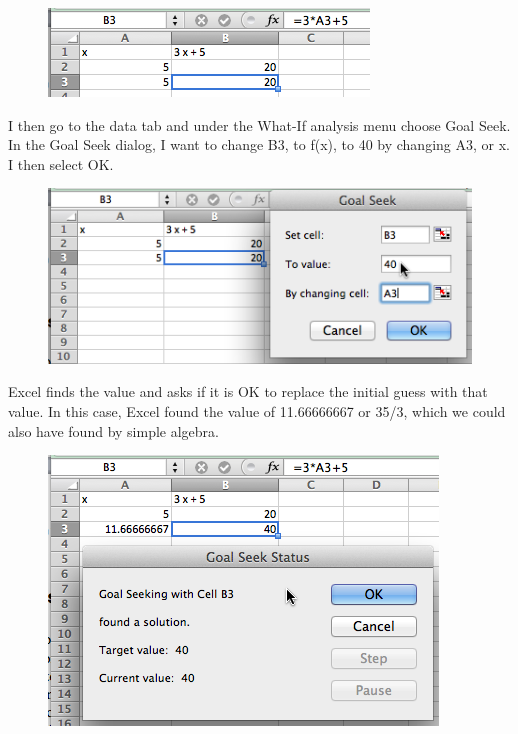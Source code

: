 \documentclass[10pt,]{book}
\theoremstyle{plain}
\theoremstyle{definition}
\theoremstyle{definition}
\begin{document}
  \leavevmode%
\begin{figure}
\centering
\includegraphics[width=0.8\linewidth]{images/sec1-6-1.png}
\end{figure}
 

%
\par

I then go to the data tab and under the What-If analysis menu choose Goal Seek.  In the Goal Seek dialog, I want to change B3, to f(x), to 40 by changing A3, or x.  I then select OK.

  \leavevmode%
\begin{figure}
\centering
\includegraphics[width=0.8\linewidth]{images/sec1-6-2.png}
\end{figure}
 

%
\par

Excel finds the value and asks if it is OK to replace the initial guess with that value.  In this case, Excel found the value of 11.66666667 or 35/3, which we could also have found by simple algebra.

  \leavevmode%
\begin{figure}
\centering
\includegraphics[width=0.8\linewidth]{images/sec1-6-3.png}
\end{figure}
 
\end{document}
